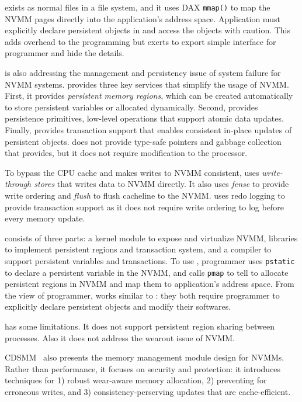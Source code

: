 \nvh{} exists as normal files in a file system, and it uses DAX
\texttt{mmap()} to map the NVMM pages directly into the application's
address space. Application must explicitly declare persistent objects in
\nvh{} and access the objects with caution. This adds overhead to the
programming but \nvh{} exerts to export simple interface for programmer
and hide the details.

\mnem{} is also addressing the management and persistency issue
of system failure for NVMM systems. \mnem{} provides three key services
that simplify the usage of NVMM. First, it provides \emph{persistent
memory regions}, which can be created automatically to store persistent 
variables or allocated dynamically. Second, \mnem{} provides persistence
primitives, low-level operations that support atomic data updates. Finally,
\mnem{} provides transaction support that enables consistent in-place
updates of persistent objects. \mnem{} does not provide type-safe pointers
and gabbage collection that \nvh{} provides, but it does not require
modification to the processor.

To bypass the CPU cache and makes writes to NVMM consistent, \mnem{} uses
\emph{write-through stores} that writes data to NVMM directly. It also
uses \emph{fense} to provide write ordering and \emph{flush} to flush
cacheline to the NVMM. \mnem{} uses redo logging to provide transaction support
as it does not require write ordering to log before every memory update.

\mnem{} consists of three parts: a kernel module to expose and virtualize NVMM, 
libraries to implement persistent regions and transaction system, and
a compiler to support persistent variables and transactions. To use \mnem{},
programmer uses \texttt{pstatic} to declare a persistent variable in the NVMM,
and calls \texttt{pmap} to tell \mnem{} to allocate persistent regions in NVMM
and map them to application's address space. From the view of programmer,
\mnem{} works similar to \nvh{}: they both require programmer to explicitly
declare persistent objects and modify their softwares.

\mnem{} has some limitations. It does not support persistent region sharing
between processes. Also it does not address the wearout issue of NVMM.

CDSMM~\cite{CDSMM} also presents the memory management module design for NVMMs.
Rather than performance, it focuses on security and protection: it introduces
techniques for 1) robust wear-aware memory allocation, 2) preventing for 
erroneous writes, and 3) consistency-perserving updates that are cache-efficient.

